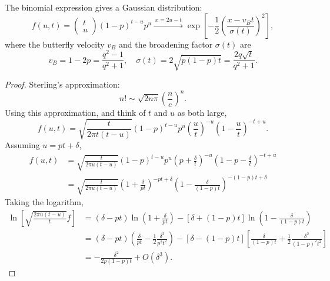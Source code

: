 \documentclass{SciPost}
\begin{document}
\begin{thm}
The binomial expression gives a Gaussian distribution:
\begin{equation*}
	f(u,t) = \begin{pmatrix} t \\ u \end{pmatrix} (1-p)^{t-u} p^u
	\xrightarrow{\ x=2u-t\ } \exp\left[-\frac{1}{2}\left(\frac{x - v_B t}{\sigma(t)}\right)^2\right],
\end{equation*}
where the butterfly velocity $v_B$ and the broadening factor $\sigma(t)$ are
\begin{equation*}
	v_B = 1-2p = \frac{q^2-1}{q^2+1},\quad 
	\sigma(t) = 2\sqrt{p(1-p)t} = \frac{2 q \sqrt t}{q^2+1}.
\end{equation*}
\end{thm}
\begin{proof}
Sterling's approximation:
\begin{equation}
	n! \sim \sqrt{2n\pi} \left(\frac{n}{e}\right)^n.
\end{equation}
Using this approximation, and think of $t$ and $u$ as both large,
\begin{equation*}
	f(u,t) = \sqrt{\frac{t}{2\pi t(t-u)}} (1-p)^{t-u} p^u \left(\frac{u}{t}\right)^{-u} \left(1-\frac{u}{t}\right)^{-t+u}.
\end{equation*}
Assuming $u = pt +\delta$,
\begin{equation*}
\begin{aligned}
	f(u,t) &= \sqrt{\frac{t}{2\pi u(t-u)}}(1-p)^{t-u} p^u \left(p+\frac{\delta}{t}\right)^{-u} \left(1-p-\frac{\delta}{t}\right)^{-t+u} \\
	&= \sqrt{\frac{t}{2\pi u(t-u)}} \left(1+\frac{\delta}{pt}\right)^{-pt+\delta} \left(1-\frac{\delta}{(1-p)t}\right)^{-(1-p)t+\delta}
\end{aligned}
\end{equation*}
Taking the logarithm,
\begin{equation*}
\begin{aligned}
	\ln \left[\sqrt{\frac{2\pi u(t-u)}{t}}f \right]
	&= (\delta-pt)\ln  \left(1+\frac{\delta}{pt}\right) -[\delta+(1-p)t]\ln\left(1-\frac{\delta}{(1-p)t}\right) \\
	&= (\delta-pt) \left(\frac{\delta}{pt}-\frac{1}{2}\frac{\delta^2}{p^2t^2}\right)
	-[\delta-(1-p)t]\left[\frac{\delta}{(1-p)t}+\frac{1}{2}\frac{\delta^2}{(1-p)^2t^2}\right] \\
	&= -\frac{\delta^2}{2 p(1-p) t} + O(\delta^3).
\end{aligned}

\end{equation*}
\end{proof}
\end{document}
